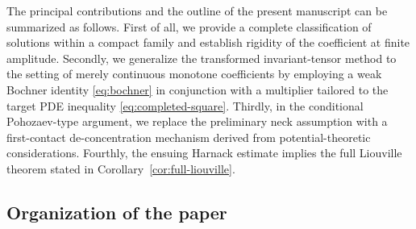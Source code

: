\documentclass[reqno,12pt]{amsart}
\numberwithin{equation}{section}
\theoremstyle{remark}
\begin{document}


The principal contributions and the outline of the present manuscript can be summarized as follows.  First of all, we provide a complete classification of solutions within a compact family and establish rigidity of the coefficient at finite amplitude.  
Secondly, we generalize the transformed invariant-tensor method to the setting of merely continuous monotone coefficients by employing a weak Bochner identity \eqref{eq:bochner} in conjunction with a multiplier tailored to the target PDE inequality \eqref{eq:completed-square}.  
Thirdly, in the conditional Pohozaev-type argument, we replace the preliminary neck assumption with a first-contact de-concentration mechanism derived from potential-theoretic considerations.  
Fourthly, the ensuing Harnack estimate implies the full Liouville theorem stated in Corollary~\ref{cor:full-liouville}.

\subsection{Organization of the paper}
\end{document}
